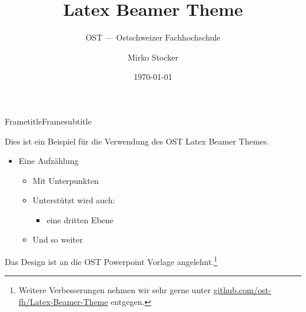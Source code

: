 \documentclass[aspectratio=169,20pt]{beamer}
\title{Latex Beamer Theme}
\subtitle{OST — Ostschweizer Fachhochschule}
\date{\today}
\author{Mirko Stocker}
\institute{Institut für Software}
\begin{document}
\begin{frame}
    \titlepage
\end{frame}

\begin{frame}{Frametitle}{Framesubtitle}

    Dies ist ein Beispiel für die Verwendung des OST Latex Beamer Themes.

    \begin{itemize}
        \item{Eine Aufzählung}
              \begin{itemize}
                  \item{Mit Unterpunkten}
                  \item{Unterstützt wird auch:}
                        \begin{itemize}
                            \item{eine dritten Ebene}
                        \end{itemize}
                  \item{Und so weiter}
              \end{itemize}
    \end{itemize}

    Das Design ist an die OST Powerpoint Vorlage angelehnt.\footnote{Weitere Verbesserungen nehmen wir sehr gerne unter \href{https://github.com/ost-fh/Latex-Beamer-Theme}{github.com/ost-fh/Latex-Beamer-Theme} entgegen.}

\end{frame}
\end{document}
